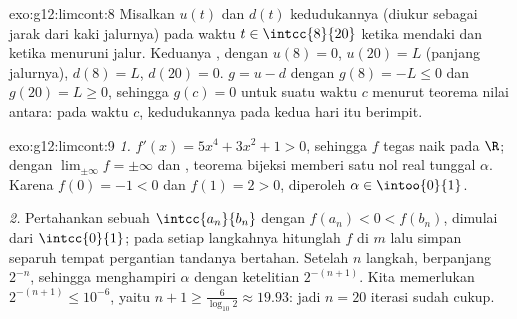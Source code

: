 \begin{solution}{exo:g12:limcont:8}
Misalkan $u(t)$ dan $d(t)$ kedudukannya (diukur sebagai jarak dari kaki
jalurnya) pada waktu $t \in \intcc{8}{20}$ ketika mendaki dan ketika menuruni
jalur. Keduanya , dengan $u(8) = 0$, $u(20) = L$ (panjang jalurnya),
$d(8) = L$, $d(20) = 0$.  $g = u - d$  dengan
$g(8) = -L \leq 0$ dan $g(20) = L \geq 0$, sehingga $g(c) = 0$ untuk suatu
waktu $c$ menurut teorema nilai antara: pada waktu $c$, kedudukannya pada
kedua hari itu berimpit.
\end{solution}

\begin{solution}{exo:g12:limcont:9}
\emph{1.} $f'(x) = 5x^4 + 3x^2 + 1 > 0$, sehingga $f$ tegas naik pada
$\R$; dengan $\lim_{\pm\infty} f = \pm\infty$ dan , teorema
bijeksi memberi satu nol real tunggal $\alpha$. Karena $f(0) = -1 < 0$ dan
$f(1) = 2 > 0$, diperoleh $\alpha \in \intoo{0}{1}$.

\emph{2.} Pertahankan sebuah  $\intcc{a_n}{b_n}$ dengan
$f(a_n) < 0 < f(b_n)$, dimulai dari $\intcc{0}{1}$; pada setiap langkahnya
hitunglah $f$ di  $m$ lalu simpan separuh  tempat
pergantian tandanya bertahan. Setelah $n$ langkah,  berpanjang
$2^{-n}$, sehingga  menghampiri $\alpha$ dengan ketelitian
$2^{-(n+1)}$. Kita memerlukan $2^{-(n+1)} \leq 10^{-6}$, yaitu
$n + 1 \geq \frac{6}{\log_{10} 2} \approx 19.93$: jadi $n = 20$ iterasi sudah cukup.
\end{solution}

